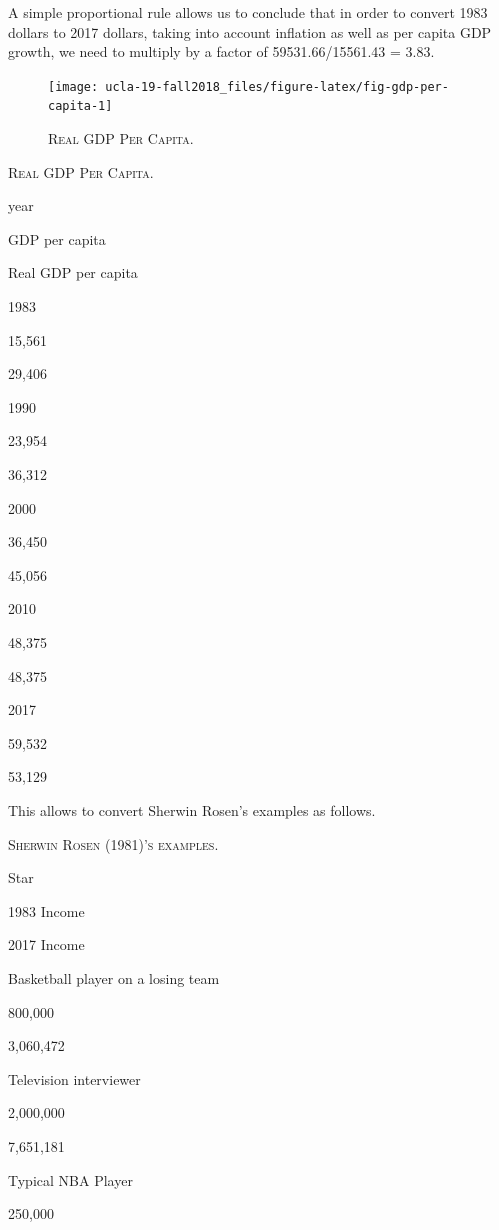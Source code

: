 \documentclass[]{book}
\theoremstyle{definition}
\theoremstyle{definition}
\theoremstyle{definition}
\theoremstyle{remark}
\begin{document}
A simple proportional rule allows us to conclude that in order to
convert 1983 dollars to 2017 dollars, taking into account inflation as
well as per capita GDP growth, we need to multiply by a factor of
59531.66/15561.43 = 3.83.



\begin{figure}

{\centering \texttt{[image: ucla-19-fall2018\_files/figure-latex/fig-gdp-per-capita-1]} 

}

\caption{\textsc{Real GDP Per Capita.}}\label{fig:fig-gdp-per-capita}
\end{figure}



\label{tab:real-gdp-per-capita}\textsc{Real GDP Per Capita.}

year

GDP per capita

Real GDP per capita

1983

15,561

29,406

1990

23,954

36,312

2000

36,450

45,056

2010

48,375

48,375

2017

59,532

53,129

This allows to convert Sherwin Rosen's examples as follows.



\label{tab:rosen-examples}\textsc{Sherwin Rosen (1981)'s examples.}

Star

1983 Income

2017 Income

Basketball player on a losing team

800,000

3,060,472

Television interviewer

2,000,000

7,651,181

Typical NBA Player

250,000
\end{document}
